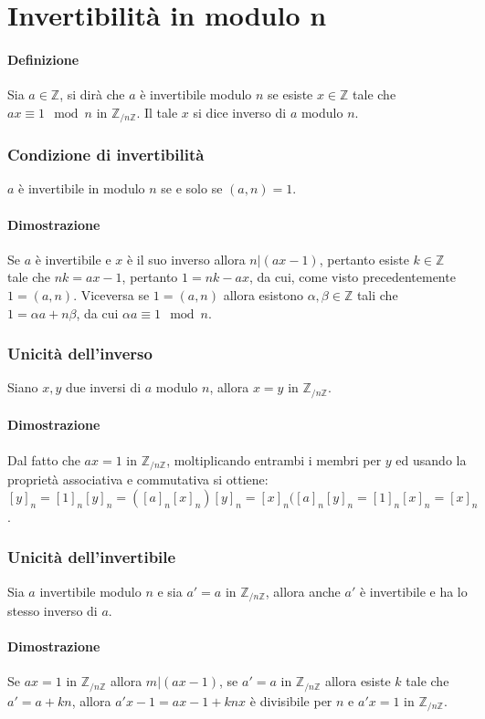 \chapter{Invertibilit\`a in modulo n}
\subsubsection{Definizione}
Sia $a\in\mathbb{Z}$, si dir\`a che $a$ \`e invertibile modulo $n$ se esiste $x\in\mathbb{Z}$ tale che $ax\equiv 1\mod n$ in $\mathbb{Z}_{/n\mathbb{Z}}$. Il tale $x$ si dice
inverso di $a$ modulo $n$. 
\subsection{Condizione di invertibilit\`a}
$a$ \`e invertibile in modulo $n$ se e solo se $(a,n)=1$.
\subsubsection{Dimostrazione}
Se $a$ \`e invertibile e $x$ \`e il suo inverso allora $n|(ax-1)$, pertanto esiste $k\in\mathbb{Z}$ tale che $nk=ax-1$, pertanto $1=nk-ax$, da cui, come visto precedentemente
$1=(a,n)$. Viceversa se $1=(a,n)$ allora esistono $\alpha,\beta \in\mathbb{Z}$ tali che $1=\alpha a+n\beta$, da cui $\alpha a\equiv 1\mod n$.
\subsection{Unicit\`a dell'inverso}
Siano $x, y$ due inversi di $a$ modulo $n$, allora $x=y$ in $\mathbb{Z}_{/n\mathbb{Z}}$.
\subsubsection{Dimostrazione}
Dal fatto che $ax=1$ in $\mathbb{Z}_{/n\mathbb{Z}}$, moltiplicando entrambi i membri per $y$ ed usando la propriet\`a associativa e commutativa si ottiene:
$[y]_n=[1]_n[y]_n=([a]_n[x]_n)[y]_n=[x]_n([a]_n[y]_n=[1]_n[x]_n=[x]_n$.
\subsection{Unicit\`a dell'invertibile}
Sia $a$ invertibile modulo $n$ e sia $a'=a$ in $\mathbb{Z}_{/n\mathbb{Z}}$, allora anche $a'$ \`e invertibile e ha lo stesso inverso di $a$. 
\subsubsection{Dimostrazione}
Se $ax=1$ in $\mathbb{Z}_{/n\mathbb{Z}}$ allora $m|(ax-1)$, se $a'=a$ in $\mathbb{Z}_{/n\mathbb{Z}}$ allora esiste $k$ tale che $a'=a+kn$, allora $a'x-1=ax-1+knx$ \`e divisibile
per $n$ e $a'x=1$ in $\mathbb{Z}_{/n\mathbb{Z}}$.
